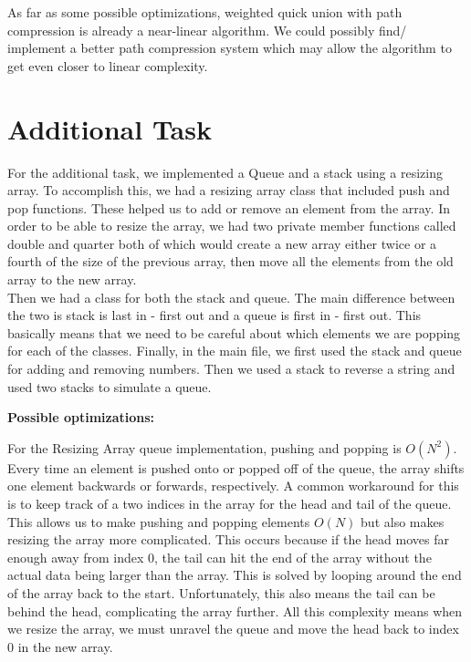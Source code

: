 \documentclass[12pt]{article}
\begin{document}
As far as some possible optimizations, weighted quick union with path compression is already a near-linear algorithm. We could possibly find/ implement a better path compression system which may allow the algorithm to get even closer to linear complexity.

\newpage
\section{Additional Task}

For the additional task, we implemented a Queue and a stack using a resizing array. To accomplish this, we had a resizing array class that included push and pop functions. These helped us to add or remove an element from the array. In order to be able to resize the array, we had two private member functions called double and quarter both of which would create a new array either twice or a fourth of the size of the previous array, then move all the elements from the old array to the new array. \\

Then we had a class for both the stack and queue. The main difference between the two is stack is last in - first out and a queue is first in - first out. This basically means that we need to be careful about which elements we are popping for each of the classes. Finally, in the main file, we first used the stack and queue for adding and removing numbers. Then we used a stack to reverse a string and used two stacks to simulate a queue.

\vspace{7mm}

\textbf{Possible optimizations:}

For the Resizing Array queue implementation, pushing and popping is $O(N^2)$. Every time an element is pushed onto or popped off of the queue, the array shifts one element backwards or forwards, respectively. A common workaround for this is to keep track of a two indices in the array for the head and tail of the queue. This allows us to make pushing and popping elements $O(N)$ but also makes resizing the array more complicated. This occurs because if the head moves far enough away from index 0, the tail can hit the end of the array without the actual data being larger than the array. This is solved by looping around the end of the array back to the start. Unfortunately, this also means the tail can be behind the head, complicating the array further. All this complexity means when we resize the array, we must unravel the queue and move the head back to index 0 in the new array.
\end{document}
